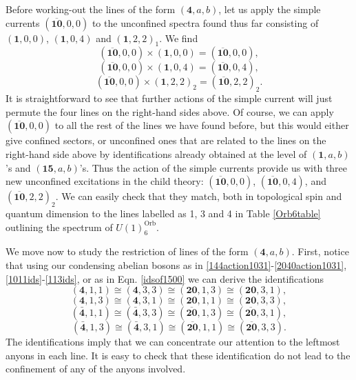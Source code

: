 \documentclass[11pt]{article}
\numberwithin{equation}{section}
\begin{document}
Before working-out the lines of the form $(\mathbf{4},a,b)$, let us apply the simple currents $(\overline{\mathbf{10}},0,0)$ to the unconfined spectra found thus far consisting of $(\mathbf{1},0,0)$, $(\mathbf{1},0,4)$ and $(\mathbf{1},2,2)_{1}$. We find
\begin{equation}
    (\overline{\mathbf{10}},0,0) \times (\mathbf{1},0,0) = (\overline{\mathbf{10}},0,0),
\end{equation}
\begin{equation}
    (\overline{\mathbf{10}},0,0) \times (\mathbf{1},0,4) = (\overline{\mathbf{10}},0,4),
\end{equation}
\begin{equation}
    (\overline{\mathbf{10}},0,0) \times (\mathbf{1},2,2)_{2} = (\overline{\mathbf{10}},2,2)_{2}.
\end{equation}
It is straightforward to see that further actions of the simple current will just permute the four lines on the right-hand sides above. Of course, we can apply $(\overline{\mathbf{10}},0,0)$ to all the rest of the lines we have found before, but this would either give confined sectors, or unconfined ones that are related to the lines on the right-hand side above by identifications already obtained at the level of $(\mathbf{1},a,b)$'s and $(\mathbf{15},a,b)$'s. Thus the action of the simple currents provide us with three new unconfined excitations in the child theory: $(\overline{\mathbf{10}},0,0)$, $(\overline{\mathbf{10}},0,4)$, and $(\overline{\mathbf{10}},2,2)_{2}$. We can easily check that they match, both in topological spin and quantum dimension to the lines labelled as 1, 3 and 4 in Table \ref{Orb6table} outlining the spectrum of $U(1)^{\mathrm{Orb}}_{6}$.

We move now to study the restriction of lines of the form $(\mathbf{4},a,b)$. First, notice that using our condensing abelian bosons as in \eqref{144action1031}-\eqref{2040action1031}, \eqref{1011ids}-\eqref{113ids}, or as in Eqn. \eqref{idsof1500} we can derive the identifications
\begin{equation}
    (\mathbf{4}, 1, 1) \cong (\mathbf{4},3,3) \cong (\mathbf{20},1,3) \cong (\mathbf{20},3,1),
\end{equation}
\begin{equation}
    (\mathbf{4}, 1, 3) \cong (\mathbf{4},3,1) \cong (\mathbf{20},1,1) \cong (\mathbf{20},3,3),
\end{equation}
\begin{equation}
    (\mathbf{\bar{4}},1,1) \cong (\mathbf{\bar{4}},3,3) \cong (\overline{\mathbf{20}},1,3) \cong (\overline{\mathbf{20}},3,1),
\end{equation}
\begin{equation}
    (\mathbf{\bar{4}},1,3) \cong (\mathbf{\bar{4}},3,1) \cong (\overline{\mathbf{20}},1,1) \cong (\overline{\mathbf{20}},3,3).
\end{equation}
The identifications imply that we can concentrate our attention to the leftmost anyons in each line. It is easy to check that these identification do not lead to the confinement of any of the anyons involved.
\end{document}
